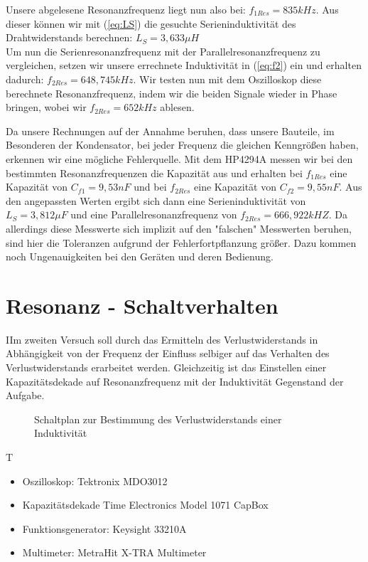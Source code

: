 \documentclass{article}
\begin{document}
Unsere abgelesene Resonanzfrequenz liegt nun also bei: $f_{1Res} = 835kHz$.
Aus dieser können wir mit (\ref{eq:LS}) die gesuchte Serieninduktivität des Drahtwiderstands berechnen: $L_S = 3,633\mu H$\\[3pt]
Um nun die Serienresonanzfrequenz mit der Parallelresonanzfrequenz zu vergleichen, setzen wir unsere errechnete Induktivität in
(\ref{eq:f2}) ein und erhalten dadurch: $f_{2Res} = 648,745kHz$. Wir testen nun mit dem Oszilloskop diese berechnete Resonanzfrequenz, indem wir
die beiden Signale wieder in Phase bringen, wobei wir $f_{2Res} = 652kHz$ ablesen.

Da unsere Rechnungen auf der Annahme beruhen, dass unsere Bauteile, im Besonderen der Kondensator, bei jeder Frequenz die gleichen Kenngrößen haben,
erkennen wir eine mögliche Fehlerquelle. Mit dem HP4294A messen wir bei den bestimmten Resonanzfrequenzen die Kapazität aus und erhalten bei $f_{1Res}$ eine Kapazität
von $C_{f1}=9,53nF$ und bei $f_{2Res}$ eine Kapazität von $C_{f2} = 9,55nF$. Aus den angepassten Werten ergibt sich dann eine Serieninduktivität von $L_S = 3,812\mu F$
und eine Parallelresonanzfrequenz von $f_{2Res} = 666,922kHZ$. Da allerdings diese Messwerte sich implizit auf den "falschen" Messwerten beruhen, sind hier die Toleranzen aufgrund der
Fehlerfortpflanzung größer. Dazu kommen noch Ungenauigkeiten bei den Geräten und deren Bedienung.


\newpage
\section{Resonanz - Schaltverhalten}
\begin{task}
  IIm zweiten Versuch soll durch das Ermitteln des Verlustwiderstands in Abhängigkeit von der Frequenz der Einfluss selbiger auf das Verhalten des Verlustwiderstands erarbeitet werden.
  Gleichzeitig ist das Einstellen einer Kapazitätsdekade auf Resonanzfrequenz mit der Induktivität Gegenstand der Aufgabe.
\end{task}
\begin{figure}[h]
  \begin{center}

    \caption{Schaltplan zur Bestimmung des Verlustwiderstands einer Induktivität}
  \end{center}
\end{figure}
\begin{devlist}
  T
  \begin{itemize}
    \item Oszilloskop: Tektronix MDO3012
    \item Kapazitätsdekade Time Electronics Model 1071 CapBox
    \item Funktionsgenerator: Keysight 33210A
    \item Multimeter: MetraHit X-TRA Multimeter
  \end{itemize}
\end{devlist}
\end{document}
